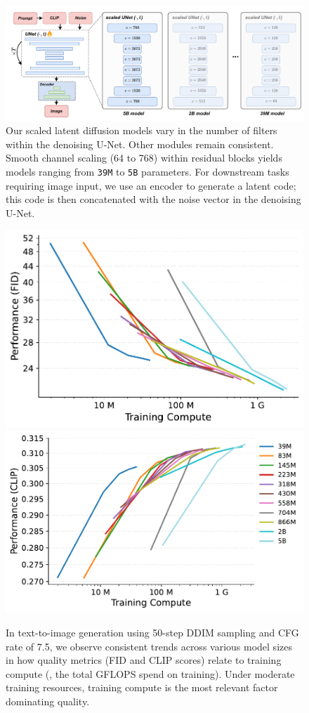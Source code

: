 \begin{figure}[t]
    \centering
    \includegraphics[width=.9\linewidth]{cp2/figures/ldm_architecture.pdf}
    \caption{Our scaled latent diffusion models vary in the number of filters within the denoising U-Net.  Other modules remain consistent.  Smooth channel scaling (64 to 768) within residual blocks yields models ranging from \texttt{39M} to \texttt{5B} parameters. For downstream tasks requiring image input, we use an encoder to generate a latent code; this code is then concatenated with the noise vector in the denoising U-Net.}
    \label{fig:scaling_arch}
\end{figure}

\begin{figure}[!h]
    \centering
    \includegraphics[height=.315\linewidth]{cp2/figures/t2i_fid_compute.pdf}
    \includegraphics[height=.315\linewidth]{cp2/figures/t2i_clip_compute.pdf}
    \caption{In text-to-image generation using 50-step DDIM sampling and CFG rate of 7.5, we observe consistent trends across various model sizes in how quality metrics (FID and CLIP scores) relate to training compute (\ie, the total GFLOPS spend on training). 
    Under moderate training resources, training compute is the most relevant factor dominating quality.
    }
    \label{fig:t2i_compute}
\end{figure}

